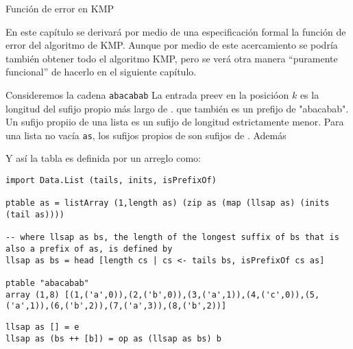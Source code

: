 Función de error en KMP

En este capítulo se derivará por medio de una especificación formal la función de error del algoritmo de KMP.
Aunque por medio de este acercamiento se podría también obtener todo el algoritmo KMP, %
pero se verá otra manera ``puramente funcional'' de hacerlo en el siguiente capítulo.

Consideremos la cadena \texttt{abacabab}
La entrada preev en la posicióon $k$ es la longitud del sufijo propio más largo de .
que también es un prefijo de "abacabab". Un sufijo propiio de una lista es un sufijo de longitud estrictamente menor.
Para una lista no vacía \texttt{as}, los sufijos propios de  son sufijos de
. Además


Y así la tabla es definida por un arreglo como:
\begin{verbatim}
import Data.List (tails, inits, isPrefixOf)

ptable as = listArray (1,length as) (zip as (map (llsap as) (inits (tail as))))

-- where llsap as bs, the length of the longest suffix of bs that is also a prefix of as, is defined by
llsap as bs = head [length cs | cs <- tails bs, isPrefixOf cs as]

ptable "abacabab"
array (1,8) [(1,('a',0)),(2,('b',0)),(3,('a',1)),(4,('c',0)),(5,('a',1)),(6,('b',2)),(7,('a',3)),(8,('b',2))]
\end{verbatim}

\begin{verbatim}
llsap as [] = e
llsap as (bs ++ [b]) = op as (llsap as bs) b
\end{verbatim}


\inputminted{haskell}{codigo/haskell/failure-function.hs}

